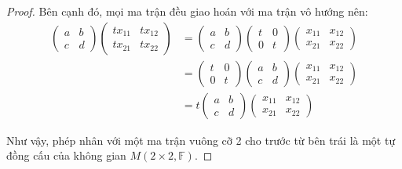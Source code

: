 \begin{proof}
    Bên cạnh đó, mọi ma trận đều giao hoán với ma trận vô hướng nên:
    \begin{align*}
        \begin{pmatrix}
            a & b \\
            c & d
        \end{pmatrix}
        \begin{pmatrix}
            tx_{11} & tx_{12} \\
            tx_{21} & tx_{22}
        \end{pmatrix} & =
        \begin{pmatrix}
            a & b \\
            c & d
        \end{pmatrix}
        \begin{pmatrix}
            t & 0 \\
            0 & t
        \end{pmatrix}
        \begin{pmatrix}
            x_{11} & x_{12} \\
            x_{21} & x_{22}
        \end{pmatrix}          \\
                             & =
        \begin{pmatrix}
            t & 0 \\
            0 & t
        \end{pmatrix}
        \begin{pmatrix}
            a & b \\
            c & d
        \end{pmatrix}
        \begin{pmatrix}
            x_{11} & x_{12} \\
            x_{21} & x_{22}
        \end{pmatrix}          \\
                             & =
        t
        \begin{pmatrix}
            a & b \\
            c & d
        \end{pmatrix}
        \begin{pmatrix}
            x_{11} & x_{12} \\
            x_{21} & x_{22}
        \end{pmatrix}
    \end{align*}
    
    Như vậy, phép nhân với một ma trận vuông cỡ 2 cho trước từ bên trái là một tự đồng cấu của không gian $M(2\times 2,\mathbb{F})$.
    

\end{proof}
